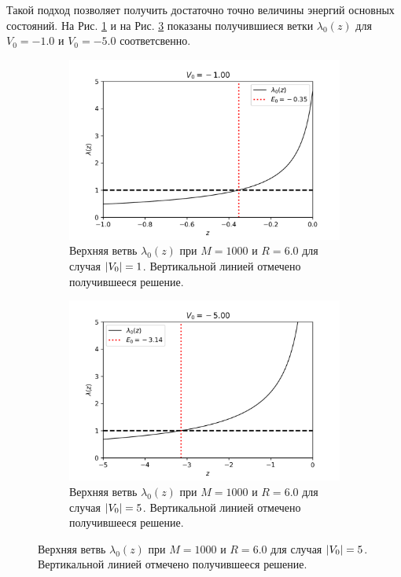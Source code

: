 \documentclass[10pt]{article}
\begin{document}
Такой подход позволяет получить достаточно точно величины энергий основных состояний. На Рис. \ref{fig:-1.0_l0} и на Рис. \ref{fig:-5.0_l0} показаны получившиеся ветки $\lambda_0(z)$ для $V_0 = -1.0$ и $V_0=-5.0$ соответсвенно.
\begin{figure}[htbp]
 \centering
 \begin{subfigure}[b]{0.49\textwidth}
    \includegraphics[width=\textwidth]{../figures/-1.0_l0}
    \caption{Верхняя ветвь $\lambda_0(z)$ при $M=1000$ и $R=6.0$ для случая $\abs{V_0}=1$. Вертикальной линией отмечено получившееся решение.}
    \label{fig:-1.0_l0}
\end{subfigure}
\hfill
\begin{subfigure}[b]{0.49\textwidth}
    \centering
    \includegraphics[width=\textwidth]{../figures/-5.0_l0}
    \caption{Верхняя ветвь $\lambda_0(z)$ при $M=1000$ и $R=6.0$ для случая $\abs{V_0}=5$. Вертикальной линией отмечено получившееся решение.}
    \label{fig:-5.0_l0}
\end{subfigure}
\end{figure}
\end{document}
